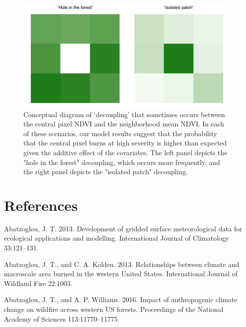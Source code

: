 \documentclass[twoside,12pt,final]{ucthesis-CA2012}
\begin{document}
\begin{ucmainmatter}
\begin{figure}
\centering
\includegraphics[width=6.00000in]{figure/chap01/decoupling-center-neighborhood-ndvi.png}
\caption{Conceptual diagram of `decoupling' that sometimes occurs
between the central pixel NDVI and the neighborhood mean NDVI. In each
of these scenarios, our model results suggest that the probability that
the central pixel burns at high severity is higher than expected given
the additive effect of the covariates. The left panel depicts the "hole
in the forest" decoupling, which occurs more frequently, and the right
panel depicts the "isolated patch" decoupling.}
\end{figure}
\backmatter

\chapter*{References}\label{references}


\noindent

\setlength{\parindent}{-0.20in} \setlength{\leftskip}{0.20in}
\setlength{\parskip}{8pt}

\hypertarget{refs}{}
\hypertarget{ref-abatzoglou2013}{}
Abatzoglou, J. T. 2013. Development of gridded surface meteorological
data for ecological applications and modelling. International Journal of
Climatology 33:121--131.

\hypertarget{ref-abatzoglou2013a}{}
Abatzoglou, J. T., and C. A. Kolden. 2013. Relationships between climate
and macroscale area burned in the western United States. International
Journal of Wildland Fire 22:1003.

\hypertarget{ref-abatzoglou2016}{}
Abatzoglou, J. T., and A. P. Williams. 2016. Impact of anthropogenic
climate change on wildfire across western US forests. Proceedings of the
National Academy of Sciences 113:11770--11775.


\end{ucmainmatter}
\end{document}
